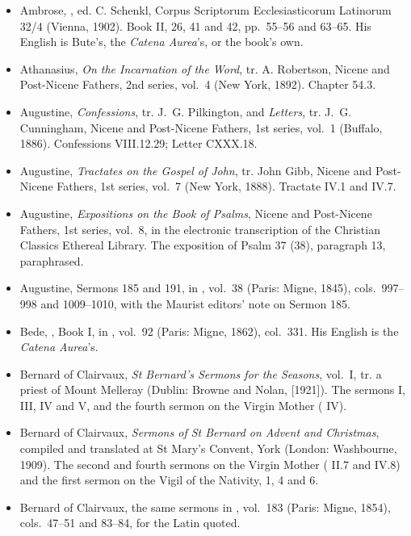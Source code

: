 \begin{itemize}[leftmargin=1.3em, itemsep=0.3em]
\item Ambrose, , ed. C. Schenkl, Corpus Scriptorum
Ecclesiasticorum Latinorum 32/4 (Vienna, 1902). Book II, 26, 41 and 42, pp.~55--56 and 63--65. His
English is Bute's, the \textit{Catena Aurea}'s, or the book's own.
\item Athanasius, \textit{On the Incarnation of the Word}, tr. A. Robertson, Nicene and Post-Nicene
Fathers, 2nd series, vol.~4 (New York, 1892). Chapter 54.3.
\item Augustine, \textit{Confessions}, tr. J.~G. Pilkington, and \textit{Letters}, tr. J.~G.
Cunningham, Nicene and Post-Nicene Fathers, 1st series, vol.~1 (Buffalo, 1886). Confessions
VIII.12.29; Letter CXXX.18.
\item Augustine, \textit{Tractates on the Gospel of John}, tr. John Gibb, Nicene and Post-Nicene
Fathers, 1st series, vol.~7 (New York, 1888). Tractate IV.1 and IV.7.
\item Augustine, \textit{Expositions on the Book of Psalms}, Nicene and Post-Nicene Fathers, 1st
series, vol.~8, in the electronic transcription of the Christian Classics Ethereal Library. The
exposition of Psalm 37 (38), paragraph 13, paraphrased.
\item Augustine, Sermons 185 and 191, in , vol.~38 (Paris: Migne, 1845),
cols.~997--998 and 1009--1010, with the Maurist editors' note on Sermon 185.
\item Bede, , Book I, in , vol.~92
(Paris: Migne, 1862), col.~331. His English is the \textit{Catena Aurea}'s.
\item Bernard of Clairvaux, \textit{St Bernard's Sermons for the Seasons}, vol.~I, tr. a priest of
Mount Melleray (Dublin: Browne and Nolan, [1921]). The sermons  I, III,
IV and V, and the fourth sermon on the Virgin Mother ( IV).
\item Bernard of Clairvaux, \textit{Sermons of St Bernard on Advent and Christmas}, compiled and
translated at St Mary's Convent, York (London: Washbourne, 1909). The second and fourth sermons on
the Virgin Mother ( II.7 and IV.8) and the first sermon on the Vigil of the
Nativity, 1, 4 and 6.
\item Bernard of Clairvaux, the same sermons in , vol.~183 (Paris: Migne,
1854), cols.~47--51 and 83--84, for the Latin quoted.

\end{itemize}
